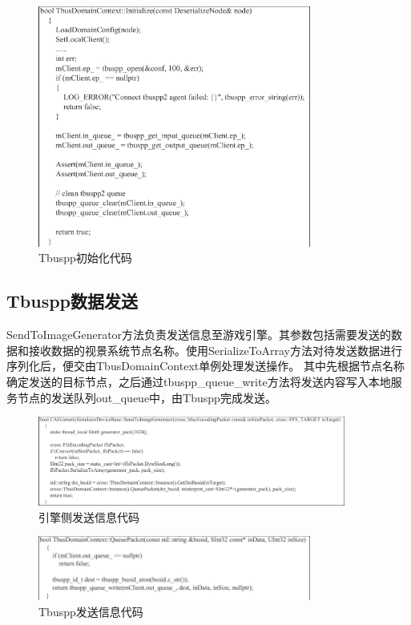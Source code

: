 \begin{figure}[h!]
    \begin{center}
        \includegraphics[width=0.8\textwidth]{pictures/code19.pdf}
        \caption{Tbuspp初始化代码}
    \end{center}
\end{figure}
\subsection{Tbuspp数据发送}
SendToImageGenerator方法负责发送信息至游戏引擎。其参数包括需要发送的数据和接收数据的视景系统节点名称。使用SerializeToArray方法对待发送数据进行序列化后，便交由TbusDomainContext单例处理发送操作。
其中先根据节点名称确定发送的目标节点，之后通过tbuspp\_queue\_write方法将发送内容写入本地服务节点的发送队列out\_queue中，由Tbuspp完成发送。
\begin{figure}[h!]
    \begin{center}
        \includegraphics[width=0.9\textwidth]{pictures/code20.pdf}
        \caption{引擎侧发送信息代码}
    \end{center}
\end{figure}
\begin{figure}[h!]
    \begin{center}
        \includegraphics[width=0.8\textwidth]{pictures/code21.pdf}
        \caption{Tbuspp发送信息代码}
    \end{center}
\end{figure}
